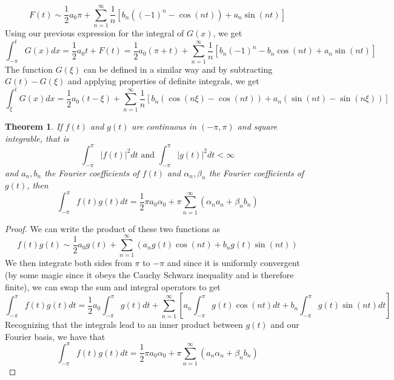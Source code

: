 \documentclass{report}
\newtheorem{theorem}{Theorem}[chapter]
\theoremstyle{definition}
\theoremstyle{remark}
\begin{document}
\begin{equation*}
    F(t)\sim\frac{1}{2}a_0\pi +\sum^\infty_{n=1}\frac{1}{n}[b_n((-1)^n-\cos(nt))+a_n\sin(nt)]
\end{equation*}
Using our previous expression for the integral of $G(x)$, we get 
\begin{equation*}
    \int^t_{-\pi}G(x)dx = \frac{1}{2}a_0t+F(t) = \frac{1}{2}a_0(\pi+t)+\sum^\infty_{n=1}\frac{1}{n}[b_n(-1)^n-b_n\cos(nt)+a_n\sin(nt)]
\end{equation*}
The function $G(\xi)$ can be defined in a similar way and by subtracting $G(t)-G(\xi)$ and applying properties of definite integrals, we get 
\begin{equation*}
    \int^t_\xi G(x)dx = \frac{1}{2}a_0(t-\xi)+\sum^\infty_{n=1}\frac{1}{n}[b_n(\cos(n\xi)-\cos(nt))+a_n(\sin(nt)-\sin(n\xi))]
\end{equation*}

\begin{theorem}
    If $f(t)$ and $g(t)$ are continuous in $(-\pi,\pi)$ and square integrable, that is \label{theo:4.12}
    \begin{equation*}
        \int^\pi_{-\pi}|f(t)|^2dt \text{ and } \int^\pi_{-\pi}|g(t)|^2dt <\infty 
    \end{equation*}
    and $a_n,b_n$ the Fourier coefficients of $f(t)$ and $\alpha_n,\beta_n$ the Fourier coefficients of $g(t)$, then 
    \begin{equation*}
        \int^\pi_{-\pi}f(t)g(t)dt = \frac{1}{2}\pi a_0\alpha_0 + \pi\sum^\infty_{n=1}(\alpha_na_n+\beta_nb_n)
    \end{equation*}
\end{theorem}
\begin{proof}
    We can write the product of these two functions as 
    \begin{equation*}
        f(t)g(t)\sim \frac{1}{2}a_0g(t)+\sum^\infty_{n=1}(a_ng(t)\cos(nt)+b_ng(t)\sin(nt))
    \end{equation*}
    We then integrate both sides from $\pi$ to $-\pi$ and since it is uniformly convergent (by some magic since it obeys the Cauchy Schwarz inequality and is therefore finite), we can swap the sum and integral operators to get 
    \begin{equation*}
        \int^\pi_{-\pi}f(t)g(t)dt= \frac{1}{2}a_0\int^\pi_{-\pi}g(t)dt +\sum^\infty_{n=1}\left[ a_n\int^\pi_{-\pi}g(t)\cos(nt)dt + b_n\int^\pi_{-\pi}g(t)\sin(nt)dt\right]
    \end{equation*}
    Recognizing that the integrals lead to an inner product between $g(t)$ and our Fourier basis, we have that 
    \begin{equation*}
        \int^\pi_{-\pi}f(t)g(t)dt = \frac{1}{2}\pi a_0\alpha_0+\pi\sum^\infty_{n=1}(a_n\alpha_n+\beta_nb_n)
    \end{equation*}
\end{proof}
\end{document}
